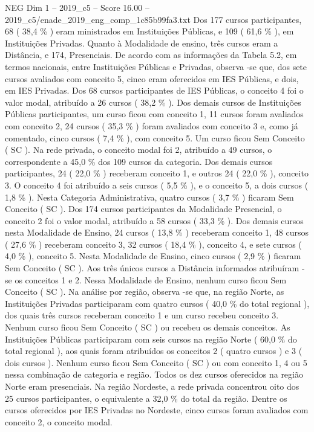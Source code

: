 \begin{textsample}{NEG Dim 1 – 2019\_c5 – Score 16.00 – 2019\_c5/enade\_2019\_eng\_comp\_1c85b99fa3.txt}
Dos 177 cursos participantes, 68 ( 38,4 \% ) eram ministrados em Instituições Públicas, e 109 ( 61,6 \% ), em Instituições Privadas.
Quanto à Modalidade de ensino, três cursos eram a Distância, e 174, Presenciais.
De acordo com as informações da Tabela 5.2, em termos nacionais, entre Instituições Públicas e Privadas, observa -se que, dos sete cursos avaliados com conceito 5, cinco eram oferecidos em IES Públicas, e dois, em IES Privadas.
Dos 68 cursos participantes de IES Públicas, o conceito 4 foi o valor modal, atribuído a 26 cursos ( 38,2 \% ).
Dos demais cursos de Instituições Públicas participantes, um curso ficou com conceito 1, 11 cursos foram avaliados com conceito 2, 24 cursos ( 35,3 \% ) foram avaliados com conceito 3 e, como já comentado, cinco cursos ( 7,4 \% ), com conceito 5.
Um curso ficou Sem Conceito ( SC ).
Na rede privada, o conceito modal foi 2, atribuído a 49 cursos, o correspondente a 45,0 \% dos 109 cursos da categoria.
Dos demais cursos participantes, 24 ( 22,0 \% ) receberam conceito 1, e outros 24 ( 22,0 \% ), conceito 3.
O conceito 4 foi atribuído a seis cursos ( 5,5 \% ), e o conceito 5, a dois cursos ( 1,8 \% ).
Nesta Categoria Administrativa, quatro cursos ( 3,7 \% ) ficaram Sem Conceito ( SC ).
Dos 174 cursos participantes da Modalidade Presencial, o conceito 2 foi o valor modal, atribuído a 58 cursos ( 33,3 \% ).
Dos demais cursos nesta Modalidade de Ensino, 24 cursos ( 13,8 \% ) receberam conceito 1, 48 cursos ( 27,6 \% ) receberam conceito 3, 32 cursos ( 18,4 \% ), conceito 4, e sete cursos ( 4,0 \% ), conceito 5.
Nesta Modalidade de Ensino, cinco cursos ( 2,9 \% ) ficaram Sem Conceito ( SC ).
Aos três únicos cursos a Distância informados atribuíram -se os conceitos 1 e 2.
Nessa Modalidade de Ensino, nenhum curso ficou Sem Conceito ( SC ).
Na análise por região, observa -se que, na região Norte, as Instituições Privadas participaram com quatro cursos ( 40,0 \% do total regional ), dos quais três cursos receberam conceito 1 e um curso recebeu conceito 3.
Nenhum curso ficou Sem Conceito ( SC ) ou recebeu os demais conceitos.
As Instituições Públicas participaram com seis cursos na região Norte ( 60,0 \% do total regional ), aos quais foram atribuídos os conceitos 2 ( quatro cursos ) e 3 ( dois cursos ).
Nenhum curso ficou Sem Conceito ( SC ) ou com conceito 1, 4 ou 5 nessa combinação de categoria e região.
Todos os dez cursos oferecidos na região Norte eram presenciais.
Na região Nordeste, a rede privada concentrou oito dos 25 cursos participantes, o equivalente a 32,0 \% do total da região.
Dentre os cursos oferecidos por IES Privadas no Nordeste, cinco cursos foram avaliados com conceito 2, o conceito modal.

\end{textsample}
